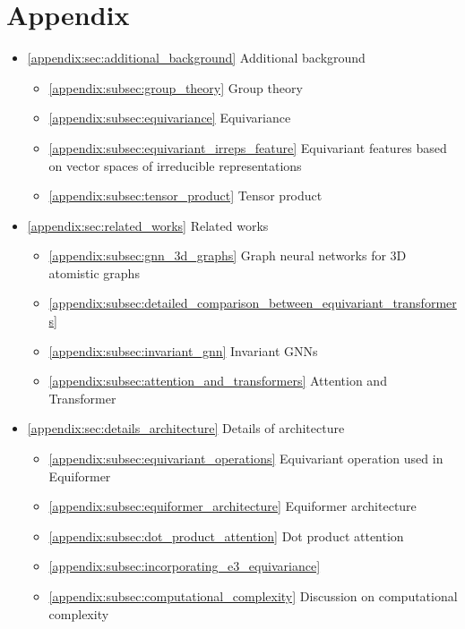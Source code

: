 \appendix
\section*{Appendix}

\begin{itemize}
    \item[] \ref{appendix:sec:additional_background} Additional background
    \begin{itemize}
        \item[] \ref{appendix:subsec:group_theory} Group theory 
        \item[] \ref{appendix:subsec:equivariance} Equivariance
        \item[] \ref{appendix:subsec:equivariant_irreps_feature} Equivariant features based on vector spaces of irreducible representations
        \item[] \ref{appendix:subsec:tensor_product} Tensor product
    \end{itemize}
    \item[] \ref{appendix:sec:related_works} Related works
    \begin{itemize}
        \item[] \ref{appendix:subsec:gnn_3d_graphs} Graph neural networks for 3D atomistic graphs
        \item[] \ref{appendix:subsec:detailed_comparison_between_equivariant_transformers} 
        \item[] \ref{appendix:subsec:invariant_gnn} Invariant GNNs
        \item[] \ref{appendix:subsec:attention_and_transformers} Attention and Transformer
    \end{itemize}
    \item[] \ref{appendix:sec:details_architecture} Details of architecture
    \begin{itemize}
        \item[] \ref{appendix:subsec:equivariant_operations} Equivariant operation used in Equiformer
        \item[] \ref{appendix:subsec:equiformer_architecture} Equiformer architecture
        \item[] \ref{appendix:subsec:dot_product_attention} Dot product attention
        \item[] \ref{appendix:subsec:incorporating_e3_equivariance} 
        \item[] \ref{appendix:subsec:computational_complexity} Discussion on computational complexity
    \end{itemize}


\end{itemize}

